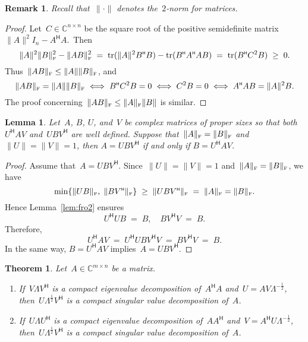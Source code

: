 \documentclass[11pt,a4paper]{article}
\newtheorem{theorem}{Theorem}%
\newtheorem{lemma}{Lemma}%
\newtheorem{remark}{Remark}%
\theoremstyle{definition}
\def\CC{\mathbb{C}}
\DeclareMathOperator{\tr}{tr}
\newcommand{\fro}{{\scriptscriptstyle{\textnormal{F}}}}
\newcommand{\hmt}{{\scriptscriptstyle{{\mathsf{H}}}}}
\begin{document}
\begin{remark}
  Recall that~$\|\cdot\|$ denotes the~$2$-norm for matrices.
\end{remark}

\begin{proof}
  Let~$C\in\CC^{n\times n}$ be the square root of the 
  positive semidefinite matrix~$\|A\|^2 I_n - A^\hmt A$.~Then%
  \begin{equation*}
  \|A\|^2\|B\|_\fro^2 - \|AB\|_\fro^2 \;=\; \tr(\|A\|^2 B^\hmt B) - \tr(B^\hmt A^\hmt A B)\;=\; \tr(B^\hmt C^2 B)\;\ge\; 0.
  \end{equation*}
  Thus~$\|AB\|_\fro \le \|A\|\|B\|_\fro$, and 
  \begin{equation*}
    \|AB\|_\fro = \|A\|\|B\|_\fro 
    \;\Longleftrightarrow \; B^\hmt C^2 B =0 
    \;\Longleftrightarrow \; C^2 B =0 
    \;\Longleftrightarrow \; A^\hmt A B = \|A\|^2 B. 
  \end{equation*}
  The proof concerning~$\|AB\|_\fro \le \|A\|_\fro\|B\|$ is similar.
\end{proof}

\begin{lemma}
  \label{lem:uav}
  Let~$A$, $B$, $U$, and~$V$ be complex matrices of proper sizes so that both~$U^\hmt AV$
  and~$UBV^\hmt$ are well defined.
  Suppose that~$\|A\|_\fro=\|B\|_\fro$ and~$\|U\|=\|V\|=1$, then $A = UBV^\hmt$ if and only if
  $B = U^\hmt A V$.
\end{lemma}

\begin{proof}
  Assume that~$A = UBV^\hmt$. Since~$\|U\|=\|V\|=1$ and~$\|A\|_\fro=\|B\|_\fro$, we have
 \begin{equation*}
   \min\{\|UB\|_\fro,\; \|BV^\hmt\|_\fro\}\;\ge\;\|UBV^\hmt\|_\fro\;=\;\|A\|_\fro = \|B\|_\fro.
 \end{equation*}
 Hence Lemma~\ref{lem:fro2} ensures
 \begin{equation*}
   U^\hmt U B \;=\; B, \quad BV^\hmt V \;=\; B.
 \end{equation*}
 Therefore,
 \begin{equation*}
   U^\hmt A V \;=\; U^\hmt U B V^\hmt V \;=\; B V^\hmt V \;=\; B.
 \end{equation*}
 In the same way, $B=U^\hmt A V$ implies~$A = UBV^\hmt$. 
\end{proof}


\begin{theorem}
  \label{th:ey}
  Let~$A \in \CC^{m\times n}$ be a matrix.
  \begin{enumerate}[leftmargin=1.5em]
  \item If~$V\Lambda V^\hmt$ is a compact eigenvalue decomposition of~$A^\hmt A$ and~$U = AV\Lambda^{-\frac{1}{2}}$, 
    then~$U\Lambda^\frac{1}{2} V^\hmt$ is a compact singular value decomposition of~$A$. 
  \item If~$U\Lambda U^\hmt$ is a compact eigenvalue decomposition of~$AA^\hmt$ and~$V = A^\hmt U\Lambda^{-\frac{1}{2}}$, 
    then~$U\Lambda^\frac{1}{2} V^\hmt$ is a compact singular value decomposition of~$A$. 
  \end{enumerate}
\end{theorem}
\end{document}
